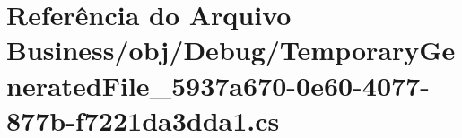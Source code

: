 \hypertarget{Business_2obj_2Debug_2TemporaryGeneratedFile__5937a670-0e60-4077-877b-f7221da3dda1_8cs}{}\section{Referência do Arquivo Business/obj/\+Debug/\+Temporary\+Generated\+File\+\_\+5937a670-\/0e60-\/4077-\/877b-\/f7221da3dda1.cs}
\label{Business_2obj_2Debug_2TemporaryGeneratedFile__5937a670-0e60-4077-877b-f7221da3dda1_8cs}
